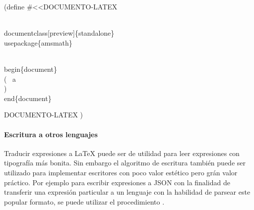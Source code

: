 \documentclass[letterpaper, twoside, openright, 11pt]{book}%
\begin{document}
\nwenddocs{}\plusendmoddef\nwstartdeflinemarkup{}\nwenddeflinemarkup
(define 
#<<DOCUMENTO-LATEX
  
\\documentclass[preview]\{standalone\}
\\usepackage\{amsmath\}

\\begin\{document\}
\\( ~a \\)
\\end\{document\}

DOCUMENTO-LATEX
  )
\eatline
{}\nwendcode{}\nwdocspar
\paragraph{Escritura a otros lenguajes} Traducir expresiones a \LaTeX{} puede ser de utilidad para leer expresiones con tipografía más bonita. Sin embargo el algoritmo de escritura también puede ser utilizado para implementar escritores con poco valor estético pero grán valor práctico. Por ejemplo para escribir expresiones a {\Tt{}JSON\nwendquote} con la finalidad de transferir una expresión particular a un lenguaje con la habilidad de parsear este popular formato, se puede utilizar el procedimiento {\Tt{}\nwendquote}.
\end{document}
